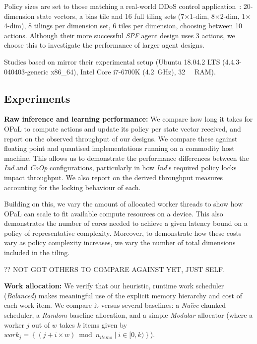 \documentclass[sigconf,natbib=false]{acmart}
\newcommand{\fakepara}[1]{\noindent\textbf{#1:}}
\newcommand{\approachshort}{OPaL}
\newcommand{\Coopfw}{CoOp}
\newcommand{\coopfw}{\Coopfw}
\newcommand{\Indfw}{Ind}
\newcommand{\indfw}{\Indfw}
\begin{document}
Policy sizes are set to those matching a real-world DDoS control application~\parencite{DBLP:journals/tnsm/SimpsonRP20}: 20-dimension state vectors, a bias tile and 16 full tiling sets (7$\times$1-dim, 8$\times$2-dim, 1$\times$4-dim), 8 tilings per dimension set, 6 tiles per dimension, choosing between 10 actions.
Although their more successful \emph{SPF} agent design uses 3 actions, we choose this to investigate the performance of larger agent designs.

Studies based on \textcite{DBLP:journals/tnsm/SimpsonRP20} mirror their experimental setup (Ubuntu 18.04.2 LTS (4.4.3-040403-generic x86\_64), Intel Core i7-6700K (\SI{4.2}{\giga\hertz}), \SI{32}{\gibi\byte} RAM).

\subsection{Experiments}

\fakepara{Raw inference and learning performance}
We compare how long it takes for \approachshort{} to compute actions and update its policy per state vector received, and report on the observed throughput of our designs.
We compare these against floating point and quantised implementations running on a commodity host machine.
This allows us to demonstrate the performance differences between the \emph{\indfw} and \emph{\coopfw} configurations, particularly in how \emph{\indfw}'s required policy locks impact throughput.
We also report on the derived throughput measures accounting for the locking behaviour of each.

Building on this, we vary the amount of allocated worker threads to show how \approachshort{} can scale to fit available compute resources on a device.
This also demonstrates the number of cores needed to achieve a given latency bound on a policy of representative complexity.
Moreover, to demonstrate how these costs vary as policy complexity increases, we vary the number of total dimensions included in the tiling.

?? NOT GOT OTHERS TO COMPARE AGAINST YET, JUST SELF.

\fakepara{Work allocation}
We verify that our heuristic, runtime work scheduler (\emph{Balanced}) makes meaningful use of the explicit memory hierarchy and cost of each work item.
We compare it versus several baselines: a \emph{Na\"{i}ve} chunked scheduler, a \emph{Random} baseline allocation, and a simple \emph{Modular} allocator (where a worker $j$ out of $w$ takes $k$ items given by $\mathit{work}_j=\left\{\left(j + i \times w\right) \bmod n_{\mathit{items}} \mid i \in [0,k) \right\}$).
\end{document}
